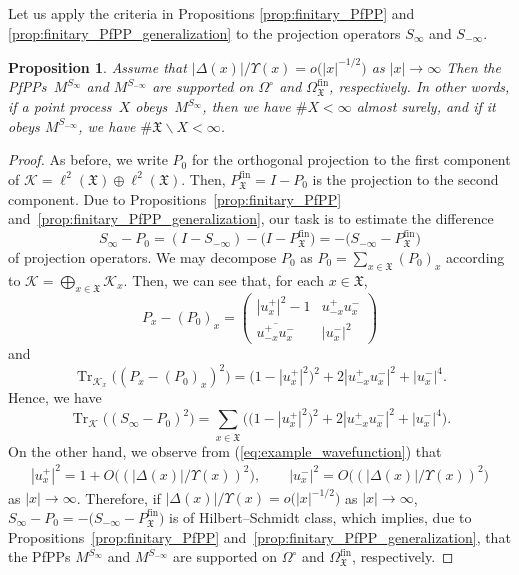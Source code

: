 \documentclass[pdftex]{sigma}
\numberwithin{equation}{section}
\newtheorem{Proposition}[Theorem]{Proposition}
 { \theoremstyle{definition}
\newtheorem{Definition}[Theorem]{Definition}
\newtheorem{Example}[Theorem]{Example}
\newtheorem{Remark}[Theorem]{Remark} }
\newcommand{\tr}{{\operatorname{Tr}}}
\newcommand{\mfrak}[1]{\mathfrak{#1}}
\newcommand{\mcal}[1]{\mathcal{#1}}
\newcommand{\mrm}[1]{\mathrm{#1}}
\begin{document}
Let us apply the criteria in Propositions \ref{prop:finitary_PfPP} and \ref{prop:finitary_PfPP_generalization} to the projection operators $S_{\infty}$ and $S_{-\infty}$.
\begin{Proposition}\label{eq:example_PfPP_ground_state}
Assume that $|\Delta (x)|/\Upsilon (x)=o\big(|x|^{-1/2}\big)$ as $|x|\to\infty$
Then the PfPPs~$M^{S_{\infty}}$ and $M^{S_{-\infty}}$ are supported on $\Omega^{\circ}$ and $\Omega_{\mfrak{X}}^{\mrm{fin}}$, respectively.
In other words, if a point process~$X$ obeys~$M^{S_{\infty}}$, then we have $\# X<\infty$ almost surely, and if it obeys $M^{S_{-\infty}}$, we have $\# \mfrak{X}\backslash X<\infty$.
\end{Proposition}
\begin{proof}As before, we write $P_{0}$ for the orthogonal projection to the first component of $\mcal{K}=\ell^{2}(\mfrak{X})\oplus\ell^{2}(\mfrak{X})$.
Then, $P_{\mfrak{X}}^{\mrm{fin}}=I-P_{0}$ is the projection to the second component.
Due to Propositions~\ref{prop:finitary_PfPP} and~\ref{prop:finitary_PfPP_generalization}, our task is to estimate the difference
\begin{equation*}
	S_{\infty}-P_{0}=(I-S_{-\infty})-\big(I-P_{\mfrak{X}}^{\mrm{fin}}\big)=-\big(S_{-\infty}-P_{\mfrak{X}}^{\mrm{fin}}\big)
\end{equation*}
of projection operators.
We may decompose $P_{0}$ as $P_{0}=\sum_{x\in\mfrak{X}}(P_{0})_{x}$ according to $\mcal{K}=\bigoplus_{x\in\mfrak{X}}\mcal{K}_{x}$.
Then, we can see that, for each $x\in\mfrak{X}$,
\begin{equation*}
	P_{x}-(P_{0})_{x}=\left(
	\begin{matrix}
		|u^{+}_{x}|^{2}-1 & u^{+}_{-x}u^{-}_{x} \\
		\overline{u^{+}_{-x}u^{-}_{x}} & |u^{-}_{x}|^{2}
	\end{matrix}
	\right)
\end{equation*}
and
\begin{equation*}
	\tr_{\mcal{K}_{x}}\big((P_{x}-(P_{0})_{x})^{2}\big)=\big(1-|u^{+}_{x}|^{2}\big)^{2}+2|u^{+}_{-x}u^{-}_{x}|^{2}+|u^{-}_{x}|^{4}.
\end{equation*}
Hence, we have
\begin{equation*}
\tr_{\mcal{K}}\big((S_{\infty}-P_{0})^{2}\big) =\sum_{x\in\mfrak{X}}\big(\big(1-|u^{+}_{x}|^{2}\big)^{2}+2|u^{+}_{-x}u^{-}_{x}|^{2}+|u^{-}_{x}|^{4}\big).
\end{equation*}
On the other hand, we observe from (\ref{eq:example_wavefunction}) that
\begin{gather*}
	|u^{+}_{x}|^{2} =1+O\big((|\Delta (x)|/\Upsilon (x))^{2}\big), \qquad
	|u^{-}_{x}|^{2} =O\big((|\Delta (x)|/\Upsilon (x))^{2}\big)
\end{gather*}
as $|x|\to\infty$.
Therefore, if $|\Delta (x)|/\Upsilon (x)=o\big(|x|^{-1/2}\big)$ as $|x|\to\infty$, $S_{\infty}-P_{0}=-\big(S_{-\infty}-P_{\mfrak{X}}^{\mrm{fin}}\big)$ is of Hilbert--Schmidt class, which implies, due to Propositions~\ref{prop:finitary_PfPP} and~\ref{prop:finitary_PfPP_generalization}, that the PfPPs $M^{S_{\infty}}$ and $M^{S_{-\infty}}$ are supported on $\Omega^{\circ}$ and $\Omega_{\mfrak{X}}^{\mrm{fin}}$, respectively.
\end{proof}
\end{document}
